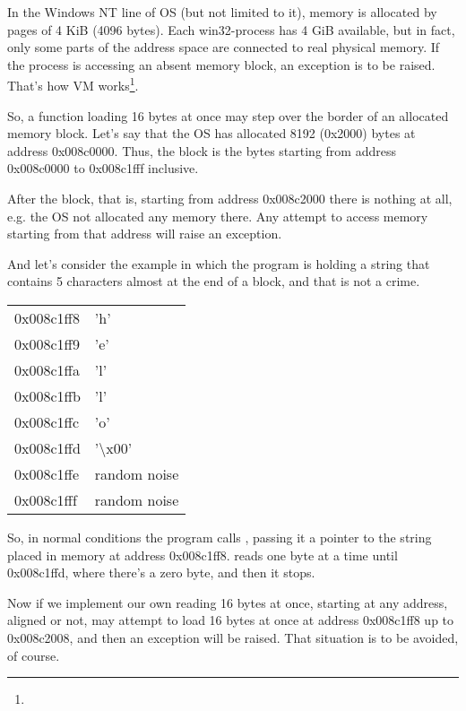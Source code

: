 In the \gls{Windows NT} line of \ac{OS} (but not limited to it), memory is allocated by pages of 4 KiB (4096 bytes).
Each win32-process has 4 GiB available, but in fact, only some parts
of the address space are connected to real physical memory.
If the process is accessing an absent memory block, an exception is to be raised.
That's how \ac{VM} works\footnote{\URLPAGE}.

So, a function loading 16 bytes at once  may step over the border of an allocated memory block.
Let's say that the \ac{OS} has allocated 8192 (0x2000) bytes at address 0x008c0000.
Thus, the block is the bytes starting from address 0x008c0000 to 0x008c1fff inclusive.

After the block, that is, starting from address 0x008c2000 there is nothing at all, e.g. the \ac{OS} not allocated
any memory there.
Any attempt to access memory starting from that address will raise an exception.

And let's consider the example in which the program is holding a string that contains 5 characters almost
at the end of a block, and that is not a crime.

\begin{center}
  \begin{tabular}{ | l | l | }
    \hline
        0x008c1ff8 & 'h' \\
        0x008c1ff9 & 'e' \\
        0x008c1ffa & 'l' \\
        0x008c1ffb & 'l' \\
        0x008c1ffc & 'o' \\
        0x008c1ffd & '\textbackslash{}x00' \\
        0x008c1ffe & random noise \\
        0x008c1fff & random noise \\
    \hline
  \end{tabular}
\end{center}

So, in normal conditions the program calls \strlen, passing it a pointer to the string  
placed in memory at address 0x008c1ff8.
\strlen reads one byte at a time until 0x008c1ffd, where there's a zero byte, and then it stops.

Now if we implement our own \strlen reading 16 bytes at once, starting at any address, aligned or not,
\MOVDQU may attempt to load 16 bytes at once at address 0x008c1ff8 up to 0x008c2008, 
and then an exception will be raised.
That situation is to be avoided, of course.

